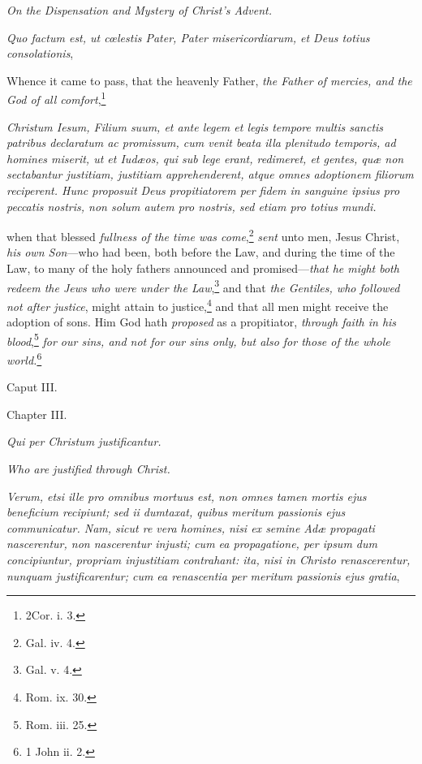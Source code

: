 \emph{On the Dispensation and Mystery of Christ's Advent.}

\emph{Quo factum est, ut cœlestis Pater, Pater misericordiarum, et Deus totius consolationis},

Whence it came to pass, that the heavenly Father, \emph{the Father of mercies, and the God of all comfort},\footnote{\par   2Cor. i. 3.}

\emph{Christum Iesum, Filium suum, et ante legem et legis tempore multis sanctis patribus declaratum ac promissum, cum venit beata illa plenitudo temporis, ad homines miserit, ut et Iudæos, qui sub lege erant, redimeret, et gentes, quæ non sectabantur justitiam, justitiam apprehenderent, atque omnes adoptionem filiorum reciperent. Hunc proposuit Deus propitiatorem per fidem in sanguine ipsius pro peccatis nostris, non solum autem pro nostris, sed etiam pro totius mundi.}

when that blessed \emph{fullness of the time was come},\footnote{\par   Gal. iv. 4.} \emph{sent} unto men, Jesus Christ, \emph{his own Son}—who had been, both before the Law, and during the time of the Law, to many of the holy fathers announced and promised—\emph{that he might both redeem the Jews who were under the Law},\footnote{\par   Gal. v. 4.} and that \emph{the Gentiles, who followed not after justice}, might attain to justice,\footnote{\par   Rom. ix. 30.} and that all men might receive the adoption of sons. Him God hath \emph{proposed} as a propitiator, \emph{through faith in his blood},\footnote{\par   Rom. iii. 25.} \emph{for our sins, and not for our sins only, but also for those of the whole world.}\footnote{\par   1 John ii. 2.}

Caput III.

Chapter III.

\emph{Qui per Christum justificantur.}

\emph{Who are justified through Christ.}

\emph{Verum, etsi ille pro omnibus mortuus est, non omnes tamen mortis ejus beneficium recipiunt; sed ii dumtaxat, quibus meritum passionis ejus communicatur. Nam, sicut re vera homines, nisi ex semine Adæ propagati nascerentur, non nascerentur injusti; cum ea propagatione, per ipsum dum concipiuntur, propriam injustitiam contrahant: ita, nisi in Christo renascerentur, nunquam justificarentur; cum ea renascentia per meritum passionis ejus gratia},

